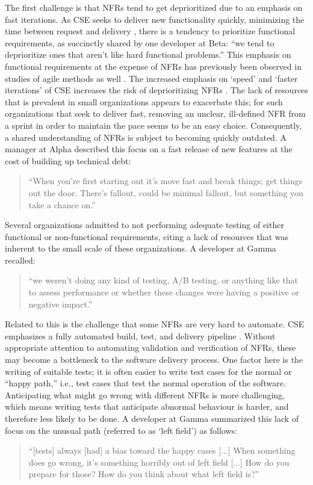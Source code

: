 \documentclass[smallextended]{svjour3}       %
\begin{document}
The first challenge is that NFRs tend to get deprioritized due to an emphasis on fast iterations. As CSE seeks to deliver new functionality quickly, minimizing the time between request and delivery \citep{fitzgerald2017continuous}, there is a tendency to prioritize functional requirements, as succinctly shared by one developer at Beta: \textmd{``we tend to deprioritize ones that aren't like hard functional problems.''}
This emphasis on functional requirements at the expense of NFRs has previously been observed in studies of agile methods as well \citep{ramesh_agile_2010}. The increased emphasis on `speed' and `faster iterations' of CSE increases the risk of deprioritizing NFRs \citep{savor_continuous_2016, gralha_evolution_2018}.
The lack of resources that is prevalent in small organizations appears to exacerbate this; for such organizations that seek to deliver fast, removing an unclear, ill-defined NFR from a sprint in order to maintain the pace seems to be an easy choice. 
Consequently, a shared understanding of NFRs is subject to becoming quickly outdated. A manager at Alpha described this focus on a fast release of new features at the cost of building up technical debt:
\begin{quote}  
``When you're first starting out it's move fast and break things; get things
out the door. There's fallout, could be minimal fallout, but something
you take a chance on.''
\end{quote}   
Several organizations admitted to not performing adequate testing of either functional or non-functional requirements, citing a lack of resources that was inherent to the small scale of these organizations. 
A developer at Gamma recalled:
\begin{quote}
    ``we weren't doing any kind of testing, A/B testing, or anything like that to assess performance or whether these changes were having a positive or negative impact.''
\end{quote}




Related to this is the challenge that some NFRs are very hard to automate.  CSE emphasizes a fully automated build, test, and delivery pipeline \citep{fitzgerald2017continuous,fowler-continuous-int,klotins2023continuous}.  
Without appropriate attention to automating validation and verification of NFRs, these may become a bottleneck to the software delivery process.
One factor here is the writing of suitable tests; it is often easier to write test cases for the normal or ``happy path,'' i.e., test cases that test the normal operation of the software. Anticipating what might go wrong with different NFRs is more challenging, which means writing tests that anticipate abnormal behaviour is harder, and therefore less likely to be done. A developer at Gamma summarized this lack of focus on the unusual path (referred to as `left field') as follows:
\begin{quote}
    ``[tests] always [had] a bias toward the happy cases [...] When something does go wrong, it's something horribly out of left field [...] How do you prepare for those? How do you think about what left field is?''
\end{quote}    
\end{document}

